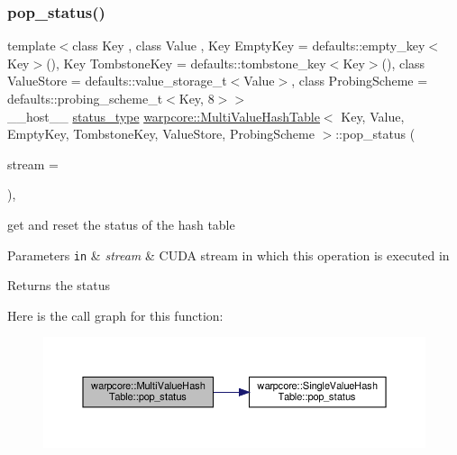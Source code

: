 \subsubsection{\texorpdfstring{pop\+\_\+status()}{pop\_status()}}
{\footnotesize\ttfamily template$<$class Key , class Value , Key Empty\+Key = defaults\+::empty\+\_\+key$<$\+Key$>$(), Key Tombstone\+Key = defaults\+::tombstone\+\_\+key$<$\+Key$>$(), class Value\+Store  = defaults\+::value\+\_\+storage\+\_\+t$<$\+Value$>$, class Probing\+Scheme  = defaults\+::probing\+\_\+scheme\+\_\+t$<$\+Key, 8$>$$>$ \\
\+\_\+\+\_\+host\+\_\+\+\_\+ \hyperlink{classwarpcore_1_1Status}{status\+\_\+type} \hyperlink{classwarpcore_1_1MultiValueHashTable}{warpcore\+::\+Multi\+Value\+Hash\+Table}$<$ Key, Value, Empty\+Key, Tombstone\+Key, Value\+Store, Probing\+Scheme $>$\+::pop\+\_\+status (\begin{DoxyParamCaption}\item[{cuda\+Stream\+\_\+t}]{stream = {} }\end{DoxyParamCaption})\hspace{0.3cm}{\ttfamily [inline]}, {\ttfamily [noexcept]}}



get and reset the status of the hash table 


\begin{DoxyParams}[1]{Parameters}
\mbox{\tt in}  & {\em stream} & C\+U\+DA stream in which this operation is executed in \\
\hline
\end{DoxyParams}
\begin{DoxyReturn}{Returns}
the status 
\end{DoxyReturn}
Here is the call graph for this function\+:
\nopagebreak
\begin{figure}[H]
\begin{center}
\leavevmode
\includegraphics[width=350pt]{classwarpcore_1_1MultiValueHashTable_af944a4ab507f431152657930db9cae99_cgraph}
\end{center}
\end{figure}
\mbox{\label{classwarpcore_1_1MultiValueHashTable_a05ca99d972b19ae69bbce6a9d6990b4c}} 
